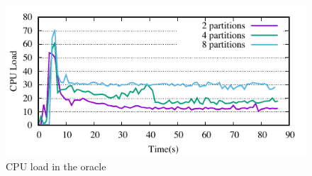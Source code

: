 \begin{figure}[ht]
	\includegraphics{figures/experiments/oracle-load}
	\caption{CPU load in the oracle}
	\label{fig:cpu_oracle}
\end{figure}


